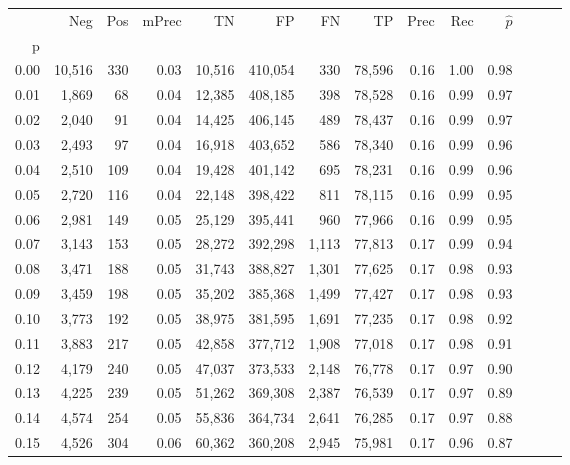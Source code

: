 \begin{tabular}{rrrrrrrrrrrrrr}
\toprule
{} &     Neg &    Pos & mPrec &       TN &       FP &      FN &      TP &  Prec &   Rec & $\hat{p}$ \\
p    &         &        &       &          &          &         &         &       &       &           \\
\midrule
0.00 &  10,516 &    330 &  0.03 &   10,516 &  410,054 &     330 &  78,596 &  0.16 &  1.00 &      0.98 \\
0.01 &   1,869 &     68 &  0.04 &   12,385 &  408,185 &     398 &  78,528 &  0.16 &  0.99 &      0.97 \\
0.02 &   2,040 &     91 &  0.04 &   14,425 &  406,145 &     489 &  78,437 &  0.16 &  0.99 &      0.97 \\
0.03 &   2,493 &     97 &  0.04 &   16,918 &  403,652 &     586 &  78,340 &  0.16 &  0.99 &      0.96 \\
0.04 &   2,510 &    109 &  0.04 &   19,428 &  401,142 &     695 &  78,231 &  0.16 &  0.99 &      0.96 \\
0.05 &   2,720 &    116 &  0.04 &   22,148 &  398,422 &     811 &  78,115 &  0.16 &  0.99 &      0.95 \\
0.06 &   2,981 &    149 &  0.05 &   25,129 &  395,441 &     960 &  77,966 &  0.16 &  0.99 &      0.95 \\
0.07 &   3,143 &    153 &  0.05 &   28,272 &  392,298 &   1,113 &  77,813 &  0.17 &  0.99 &      0.94 \\
0.08 &   3,471 &    188 &  0.05 &   31,743 &  388,827 &   1,301 &  77,625 &  0.17 &  0.98 &      0.93 \\
0.09 &   3,459 &    198 &  0.05 &   35,202 &  385,368 &   1,499 &  77,427 &  0.17 &  0.98 &      0.93 \\
0.10 &   3,773 &    192 &  0.05 &   38,975 &  381,595 &   1,691 &  77,235 &  0.17 &  0.98 &      0.92 \\
0.11 &   3,883 &    217 &  0.05 &   42,858 &  377,712 &   1,908 &  77,018 &  0.17 &  0.98 &      0.91 \\
0.12 &   4,179 &    240 &  0.05 &   47,037 &  373,533 &   2,148 &  76,778 &  0.17 &  0.97 &      0.90 \\
0.13 &   4,225 &    239 &  0.05 &   51,262 &  369,308 &   2,387 &  76,539 &  0.17 &  0.97 &      0.89 \\
0.14 &   4,574 &    254 &  0.05 &   55,836 &  364,734 &   2,641 &  76,285 &  0.17 &  0.97 &      0.88 \\
0.15 &   4,526 &    304 &  0.06 &   60,362 &  360,208 &   2,945 &  75,981 &  0.17 &  0.96 &      0.87 \\

\end{tabular}
